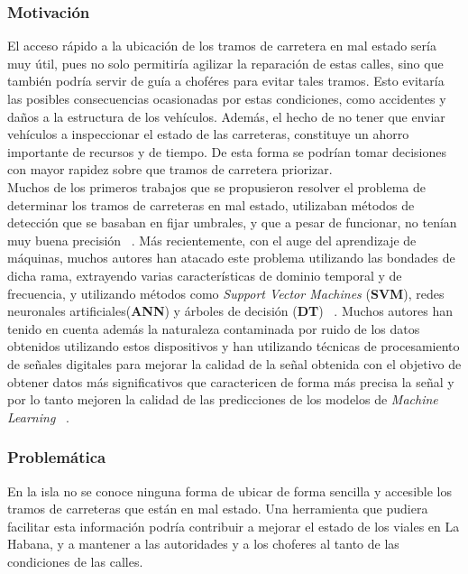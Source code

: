 	\subsubsection*{Motivación}
		El acceso rápido a la ubicación de los tramos de carretera en mal estado sería muy útil, pues no solo permitiría agilizar la
		reparación de estas calles, sino que también podría servir de guía a choféres para evitar tales tramos. Esto evitaría las posibles
		consecuencias ocasionadas por estas condiciones, como accidentes y daños a la estructura de los vehículos. Además, el hecho de no tener que
		enviar vehículos a inspeccionar el estado de las carreteras, constituye un ahorro importante de recursos y de tiempo. De esta forma se podrían
		tomar decisiones con mayor rapidez sobre que tramos de carretera priorizar.\\
		Muchos de los primeros trabajos que se propusieron resolver el problema de determinar los tramos de carreteras en mal estado, utilizaban
		métodos de detección que se basaban en fijar umbrales, y que a pesar de funcionar, no tenían muy buena precisión ~. Más recientemente, con el auge del aprendizaje de máquinas, muchos autores han atacado este problema utilizando
		las bondades de dicha rama, extrayendo varias características de dominio temporal y de frecuencia, y utilizando métodos como \emph{Support Vector
		Machines} (\textbf{SVM}), redes neuronales artificiales(\textbf{ANN}) y árboles de decisión (\textbf{DT}) ~. Muchos autores han tenido en cuenta además la naturaleza contaminada por ruido de
		los datos obtenidos utilizando estos dispositivos y han utilizando técnicas de procesamiento de señales digitales para mejorar la calidad de la señal
		obtenida con el objetivo de obtener datos más significativos que caractericen de forma más precisa la señal y por lo tanto mejoren la calidad de las
		predicciones de los modelos de \emph{Machine Learning} ~.\\
		
	\subsubsection*{Problemática}
		En la isla no se conoce ninguna forma de ubicar de forma sencilla y accesible los tramos de carreteras que están en mal estado. Una herramienta
		que pudiera facilitar esta información podría contribuir a mejorar el estado de los viales en La Habana, y a mantener a las autoridades y a los choferes
		al tanto de las condiciones de las calles.
		
